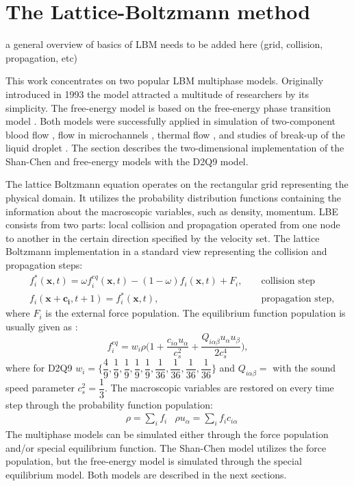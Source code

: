 \documentclass[mathpazo]{cicp}
\begin{document}
\section{The Lattice-Boltzmann method}

{\color{red} a general overview of basics of LBM needs to be added here (grid, collision, propagation, etc)}

\label{sec:lbm:binary:liquids}
This work concentrates on two popular LBM multiphase models. Originally introduced
in 1993 \cite{Shan-chen:extended} the model attracted a multitude of researchers
by its simplicity.  The free-energy model \cite{swift} is based on the free-energy
phase transition model \cite{landau}. Both models were successfully applied in simulation
of two-component blood flow \cite{halliday-multicomponent}, flow in microchannels
\cite{pooley-contact}, thermal flow \cite{zhang-thermal}, and studies of break-up
of the liquid droplet \cite{nourgaliev-breakup}. The section describes the
two-dimensional implementation of the Shan-Chen and free-energy models with
the D2Q9 model. 

The lattice Boltzmann equation operates on the rectangular grid representing the physical domain. It utilizes the probability distribution functions containing the information about the macroscopic variables, such as density, momentum. LBE consists from two parts: local collision and propagation operated from one node to another in the certain direction specified by the velocity set.  The lattice Boltzmann implementation in a standard view representing the collision and propagation steps:
\begin{equation}
\label{standard:implementation}
\begin{aligned}
&f_i^{*}(\bm{x},t)=\omega f_i^{eq}(\bm{x},t)-(1-\omega) f_i(\bm{x},t) + F_i,&&\text{ collision step}\\
&f_i(\bm{x}+\bm{c_i},t+1)=f_i^{*}(\bm{x},t),&&\text{ propagation step}, 
\end{aligned}
\end{equation}
where $F_i$ is the external force population. The equilibrium function population is usually given as \cite{}:
\begin{equation}
f_i^{eq}=w_i \rho \biggl(1+\frac{c_{i\alpha}u_{\alpha}}{c_s^2}+\frac{Q_{i\alpha\beta}u_{\alpha}u_{\beta}}{2 c_s^4}\biggr),
\end{equation}
where for D2Q9 $w_i=\{\dfrac{4}{9},\dfrac{1}{9},\dfrac{1}{9},\dfrac{1}{9},\dfrac{1}{9},\dfrac{1}{36},\dfrac{1}{36},\dfrac{1}{36},\dfrac{1}{36}\}$ and $Q_{i\alpha\beta}=$ with the sound speed parameter $c_s^2=\dfrac{1}{3}$. The macroscopic variables are restored on every time step through the probability function population:
\begin{equation*}
\begin{aligned}
&\rho=\sum_i{f_i}
&\rho u_{\alpha}=\sum_i{f_i c_{i\alpha}}
\end{aligned}
\end{equation*}
The multiphase models can be simulated either through the force population and/or special equilibrium function. The Shan-Chen model utilizes the force population, but the free-energy model is simulated through the special equilibrium model. Both models are described in the next sections.
\end{document}

